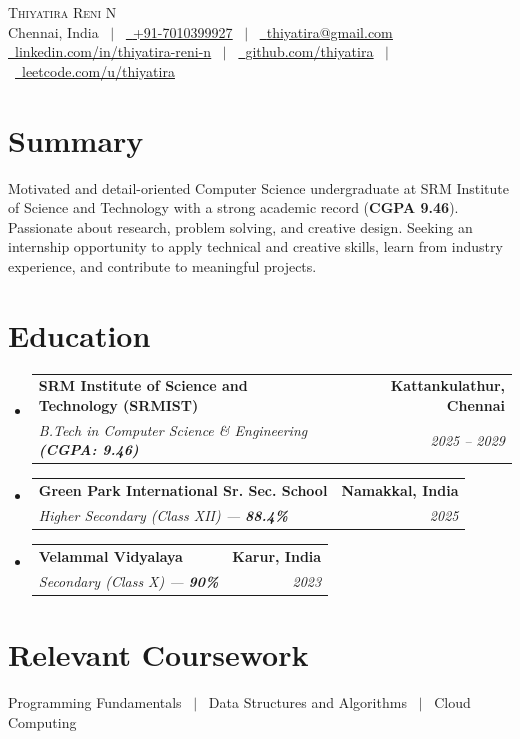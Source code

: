 \documentclass[letterpaper,10pt]{article}
\makeatletter
\newcommand{\resumeSubheading}[4]{
  \vspace{-1pt}\item
    \begin{tabular*}{1.0\textwidth}[t]{l@{\extracolsep{\fill}}r}
      \textbf{#1} & \textbf{\small #2} \\
      \textit{\small#3} & \textit{\small #4} \\
    \end{tabular*}\vspace{-4pt}
}
\newcommand{\resumeSubHeadingListStart}{\begin{itemize}[leftmargin=0.0in, label={}]}
\newcommand{\resumeSubHeadingListEnd}{\end{itemize}}
\makeatother
\begin{document}
\begin{center}
    {\Huge \scshape Thiyatira Reni N} \\ \vspace{4pt}
    \small Chennai, India \ $|$ \ 
    \href{tel:+917010399927}{\faPhone\ \underline{+91-7010399927}} \ $|$ \ 
    \href{mailto:thiyatira@gmail.com}{\faEnvelope\ \underline{thiyatira@gmail.com}} \\ \vspace{3pt}
    \href{https://www.linkedin.com/in/thiyatira-reni-n-19668b384/}{\faLinkedin\ \underline{linkedin.com/in/thiyatira-reni-n}} \ $|$ \ 
    \href{https://github.com/thiyatira}{\faGithub\ \underline{github.com/thiyatira}} \ $|$ \ 
    \href{https://leetcode.com/u/thiyatira/}{\faCode\ \underline{leetcode.com/u/thiyatira}}
\end{center}

\section{Summary}
\small{Motivated and detail-oriented Computer Science undergraduate at SRM Institute of Science and Technology with a strong academic record (\textbf{CGPA 9.46}). Passionate about research, problem solving, and creative design. Seeking an internship opportunity to apply technical and creative skills, learn from industry experience, and contribute to meaningful projects.}

\section{Education}
  \resumeSubHeadingListStart
    \resumeSubheading
      {SRM Institute of Science and Technology (SRMIST)}{Kattankulathur, Chennai}
      {B.Tech in Computer Science \& Engineering \textbf{(CGPA: 9.46)}}{2025 -- 2029}
    \resumeSubheading
      {Green Park International Sr. Sec. School}{Namakkal, India}
      {Higher Secondary (Class XII) --- \textbf{88.4\%}}{2025}
    \resumeSubheading
      {Velammal Vidyalaya}{Karur, India}
      {Secondary (Class X) --- \textbf{90\%}}{2023}
  \resumeSubHeadingListEnd

\section{Relevant Coursework}
\begin{itemize}[leftmargin=0.15in, label=\raisebox{0.15ex}{\tiny$\bullet$}, itemsep=1pt]
    \small{\item Programming Fundamentals \ $|$ \ Data Structures and Algorithms \ $|$ \ Cloud Computing}
\end{itemize}
\end{document}
